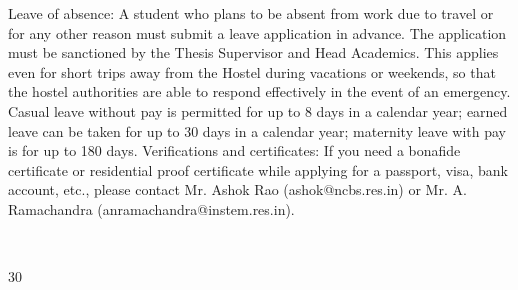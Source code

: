 \documentclass[a4paper,10pt]{article}
\begin{document}
Leave of absence: A student who plans to be absent from work due to travel or for any
other reason must submit a leave application in advance. The application must be sanctioned
by the Thesis Supervisor and Head Academics. This applies even for short trips away from
the Hostel during vacations or weekends, so that the hostel authorities are able to respond
effectively in the event of an emergency. Casual leave without pay is permitted for up to 8
days in a calendar year; earned leave can be taken for up to 30 days in a calendar year;
maternity leave with pay is for up to 180 days.
Verifications and certificates: If you need a bonafide certificate or residential proof
certificate while applying for a passport, visa, bank account, etc., please contact Mr. Ashok
Rao (ashok@ncbs.res.in) or Mr. A. Ramachandra (anramachandra@instem.res.in).
	
  

30	
  
\end{document}
